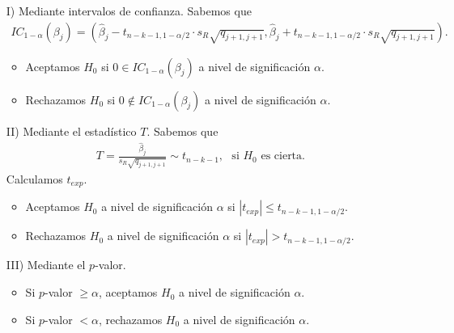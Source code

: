 \begin{enumerate}
    \item[I)] Mediante intervalos de confianza. Sabemos que
    \begin{align*}
    IC_{1-\alpha}(\beta_j) = \left( \widehat{\beta}_j - t_{n-k-1, 1 -\alpha/2} \cdot s_R \sqrt{q_{j+1,j+1}}, \widehat{\beta}_j + t_{n-k-1, 1 -\alpha/2} \cdot s_R \sqrt{q_{j+1,j+1}} \right).
\end{align*}
\begin{itemize}
    \item Aceptamos $H_0$ si $0 \in IC_{1-\alpha}(\beta_j)$ a nivel de significación $\alpha$.
    \item Rechazamos $H_0$ si $0 \not \in IC_{1-\alpha}(\beta_j)$ a nivel de significación $\alpha$.
\end{itemize}
    \item[II)] Mediante el estadístico $T$. Sabemos que
    \begin{align*}
        T = \frac{\widehat{\beta}_j}{s_R\sqrt{q_{j+1,j+1}}} \sim t_{n-k-1}, \ \ \ \text{si $H_0$ es cierta}.
    \end{align*}
    Calculamos $t_{exp}$.
    \begin{itemize}
        \item Aceptamos $H_0$ a nivel de significación $\alpha$ si $|t_{exp}| \leq t_{n-k-1,1-\alpha/2}$.
        \item Rechazamos $H_0$ a nivel de significación $\alpha$ si $|t_{exp}| > t_{n-k-1,1-\alpha/2}$.
    \end{itemize}
    \item[III)] Mediante el $p$-valor.
    \begin{itemize}
        \item Si $p$-valor $\ge \alpha$, aceptamos $H_0$ a nivel de significación $\alpha$.
        \item Si $p$-valor $< \alpha$, rechazamos $H_0$ a nivel de significación $\alpha$.
    \end{itemize}
\end{enumerate}


